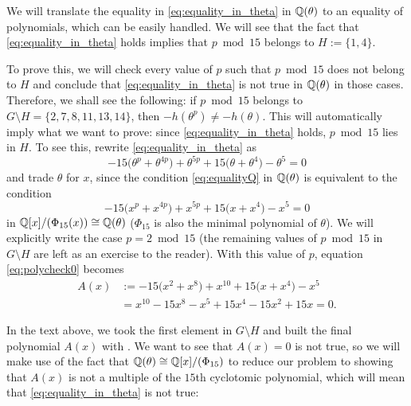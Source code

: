 \documentclass[../main.tex]{subfiles}
\begin{document}
 We will translate the equality in \cref{eq:equality_in_theta} in $\mathbb{Q}(\theta)$ to an equality of polynomials, which can be easily handled. We will see that the fact that \cref{eq:equality_in_theta} holds implies that $p \bmod{15}$ belongs to $H:=\{1,4\}$.\\

  \begin{mdframed}\small
	To prove this, we will check every value of $p$ such that $p \bmod{15}$ does not belong to $H$ and conclude that \cref{eq:equality_in_theta} is not true in $\mathbb{Q}(\theta)$ in those cases. Therefore, we shall see the following: if $p \bmod{15}$ belongs to $G\setminus H=\{2, 7, 8, 11, 13, 14\}$, then $-h(\theta^p)\neq -h(\theta)$. This will automatically imply what we want to prove: since \cref{eq:equality_in_theta} holds, $p \bmod{15}$ lies in $H$. To see this, rewrite \cref{eq:equality_in_theta} as
	\begin{equation}\label{eq:equalityQ}
		-15\big(\theta^{p}+\theta^{4p}\big)+\theta^{5p}+15\big(\theta+\theta^{4}\big)-\theta^{5}=0
	\end{equation}
	and trade $\theta$ for $x$, since the condition \cref{eq:equalityQ} in $\mathbb{Q}(\theta)$ is equivalent to the condition
	\begin{equation}\label{eq:polycheck0}
		-15\big(x^p+x^{4p}\big)+x^{5p}+15\big(x+x^{4}\big)-x^{5}=0
	\end{equation}
	in $\mathbb{Q}[x]/(\Phi_{15}(x))\cong\mathbb{Q}(\theta)$ ($\Phi_{15}$ is also the minimal polynomial of $\theta$). We will explicitly write the case $p=2 \bmod{15}$ (the remaining values of $p \bmod{15}$ in $G\setminus H$ are left as an exercise to the reader). With this value of $p$, equation \cref{eq:polycheck0} becomes
	\begin{align*}
		A(x)&:=-15\big(x^{2}+x^{8}\big)+x^{10}+15\big(x+x^{4}\big)-x^{5}\\
		&=x^{10} - 15 x^{8} - x^{5} + 15 x^{4} - 15 x^{2} + 15 x=0.
	\end{align*}
\end{mdframed}

In the text above, we took the first element in $G\setminus H$ and built the final polynomial $A(x)$ with \textcolor{blue}{}. We want to see that $A(x)=0$ is not true, so we will make use of the fact that $\mathbb{Q}(\theta)\cong\mathbb{Q}[x]/(\Phi_{15})$ to reduce our problem to showing that $A(x)$ is not a multiple of the $15$th cyclotomic polynomial, which will mean that \cref{eq:equality_in_theta} is not true:\\
\end{document}
